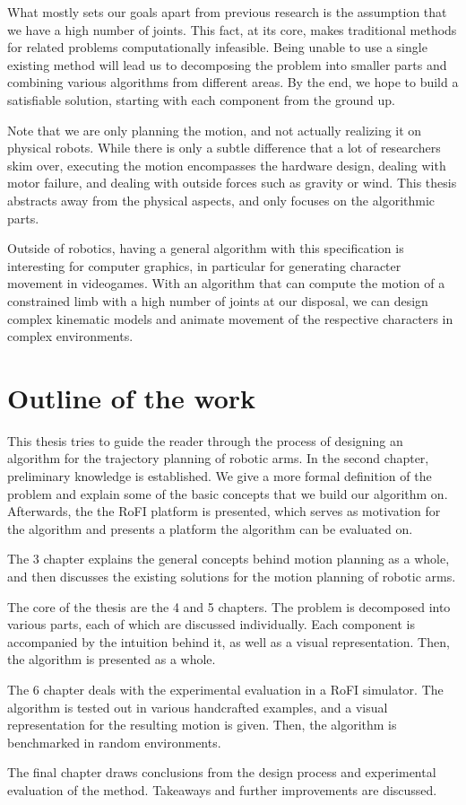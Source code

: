 What mostly sets our goals apart from previous research is the assumption that we have a high number of joints. This fact, at its core, makes traditional methods for related problems computationally infeasible.
Being unable to use a single existing method will lead us to decomposing the problem into smaller parts and combining various algorithms from different areas. By the end, we hope to build a satisfiable solution, starting with each component from the ground up.

Note that we are only planning the motion, and not actually realizing it on physical robots. While there is only a subtle difference that a lot of researchers skim over, executing the motion encompasses the hardware design, dealing with motor failure, and dealing with outside forces such as gravity or wind. This thesis abstracts away from the physical aspects, and only focuses on the algorithmic parts.

Outside of robotics, having a general algorithm with this specification is interesting for computer graphics, in particular for generating character movement in videogames.
With an algorithm that can compute the motion of a constrained limb with a high number of joints at our disposal, we can design complex kinematic models and animate movement of the respective characters in complex environments.

\section{Outline of the work}

This thesis tries to guide the reader through the process of designing an algorithm for the trajectory planning of robotic arms. In the second chapter, preliminary knowledge is established. We give a more formal definition of the problem and explain some of the basic concepts that we build our algorithm on. Afterwards, the the RoFI platform is presented, which serves as motivation for the algorithm and presents a platform the algorithm can be evaluated on.

The 3\rd{} chapter explains the general concepts behind motion planning as a whole, and then discusses the existing solutions for the motion planning of robotic arms.

The core of the thesis are the 4\th{} and 5\th{} chapters. The problem is decomposed into various parts, each of which are discussed individually. Each component is accompanied by the intuition behind it, as well as a visual representation. Then, the algorithm is presented as a whole.

The 6\th{} chapter deals with the experimental evaluation in a RoFI simulator. The algorithm is tested out in various handcrafted examples, and a visual representation for the resulting motion is given. Then, the algorithm is benchmarked in random environments.

The final chapter draws conclusions from the design process and experimental evaluation of the method. Takeaways and further improvements are discussed.
